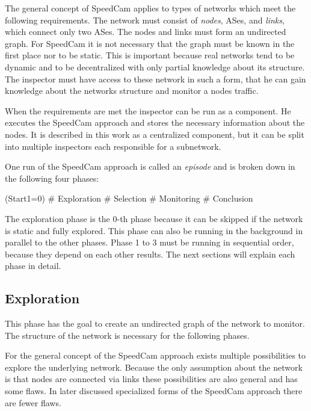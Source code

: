 \documentclass[thesis.tex]{subfiles}
\begin{document}
The general concept of SpeedCam applies to types of networks which meet the following requirements. The network must consist of \textit{nodes}, ASes, and \textit{links}, which connect only two ASes. The nodes and links must form an undirected graph. For SpeedCam it is not necessary that the graph must be known in the first place nor to be static. This is important because real networks tend to be dynamic and to be decentralized with only partial knowledge about its structure. The inspector must have access to these network in such a form, that he can gain knowledge about the networks structure and monitor a nodes traffic.

When the requirements are met the inspector can be run as a component. He executes the SpeedCam approach and stores the necessary information about the nodes. It is described in this work as a centralized component, but it can be split into multiple inspectors each responsible for a subnetwork. 

One run of the SpeedCam approach is called an \textit{episode} and is broken down in the following four phases:
\begin{easylist}
    \MyNumberedListProperties
    \ListProperties(Start1=0)
    # Exploration
    # Selection
    # Monitoring
    # Conclusion
\end{easylist}

The exploration phase is the 0-th phase because it can be skipped if the network is static and fully explored. This phase can also be running in the background in parallel to the other phases. Phase 1 to 3 must be running in sequential order, because they depend on each other results. The next sections will explain each phase in detail.

\subsection{Exploration} \label{sec:main:explorationphase}
This phase has the goal to create an undirected graph of the network to monitor. The structure of the network is necessary for the following phases. 

For the general concept of the SpeedCam approach exists multiple possibilities to explore the underlying network. Because the only assumption about the network is that nodes are connected via links these possibilities are also general and has some flaws. In later discussed specialized forms of the SpeedCam approach there are fewer flaws.
\end{document}
